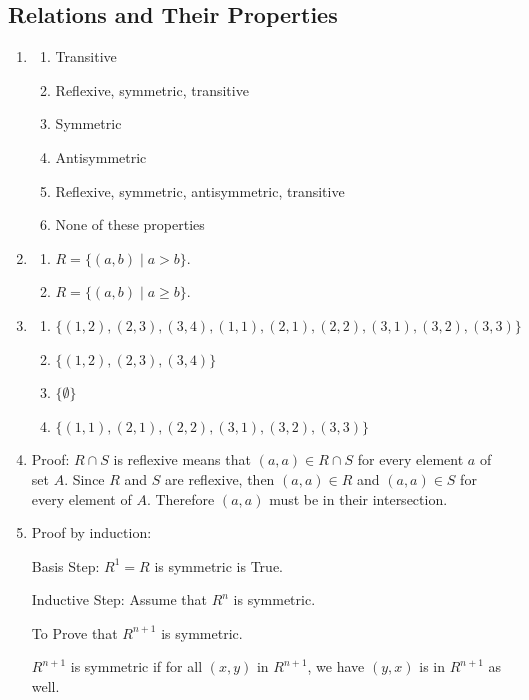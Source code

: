 \documentclass{../../cls/sig-alternate-05-2015}
\begin{document}
\subsection{Relations and Their Properties}
\begin{enumerate}
\item
\begin{enumerate}
	\item Transitive
	\item Reflexive, symmetric, transitive
	\item Symmetric
	\item Antisymmetric
	\item Reflexive, symmetric, antisymmetric, transitive
	\item None of these properties
\end{enumerate}

\item 
\begin{enumerate}
	\item $R = \{(a, b) \mid a > b\}$.
	\item $R = \{(a, b) \mid a \ge b\}$.
\end{enumerate}

\item
\begin{enumerate}
	\item  $\{(1,2), (2,3), (3,4), (1,1), (2,1), (2,2), (3,1), (3,2), (3,3)\}$
	\item $\{(1,2), (2,3), (3,4)\}$
	\item $\{\emptyset\}$
	\item $\{(1,1), (2,1), (2,2), (3,1), (3,2), (3,3)\}$
\end{enumerate}

\item Proof: $R \cap S$ is reflexive means that $(a,a) \in R\cap S $ for every element $a$ of set $A$.
Since $R$ and $S$ are reflexive, then $(a,a)\in R $ and $(a,a)\in S$ for every element of $A$.
Therefore $(a,a)$ must be in their intersection.

\item Proof by induction:

Basis Step: $R^1= R$ is symmetric is True.

Inductive Step: Assume that $R^n$ is symmetric.

To Prove that $R^{n+1}$ is symmetric.

$R^{n+1}$ is symmetric if for all $(x,y)$ in $R^{n+1}$, we have $(y,x)$ is in $R^{n+1}$ as well.


\end{enumerate}
\end{document}

